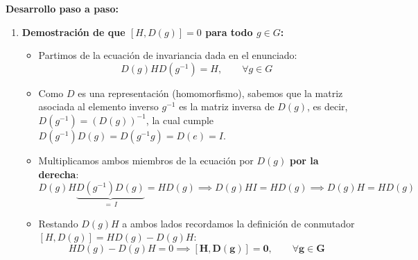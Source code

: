 \documentclass[11pt, a4paper]{article}
\begin{document}
\textbf{Desarrollo paso a paso:}
\begin{enumerate}
    \item \textbf{Demostración de que $[H, D(g)] = 0$ para todo $g \in G$:}
    \begin{itemize}
        \item Partimos de la ecuación de invariancia dada en el enunciado:
        \[
        D(g) H D(g^{-1}) = H, \qquad \forall g \in G
        \]
        \item Como $D$ es una representación (homomorfismo), sabemos que la matriz asociada al elemento inverso $g^{-1}$ es la matriz inversa de $D(g)$, es decir, $D(g^{-1}) = (D(g))^{-1}$, la cual cumple $D(g^{-1}) D(g) = D(g^{-1}g) = D(e) = I$.
        \item Multiplicamos ambos miembros de la ecuación por $D(g)$ \textbf{por la derecha}:
        \[
        D(g) H \underbrace{D(g^{-1}) D(g)}_{=\, I} = H D(g) \implies D(g) H I = H D(g) \implies D(g) H = H D(g)
        \]
        \item Restando $D(g) H$ a ambos lados recordamos la definición de conmutador $[H, D(g)] = H D(g) - D(g) H$:
        \[
        H D(g) - D(g) H = 0 \implies \mathbf{[H, D(g)] = 0, \qquad \forall g \in G}
        \]
    \end{itemize}


\end{enumerate}
\end{document}
